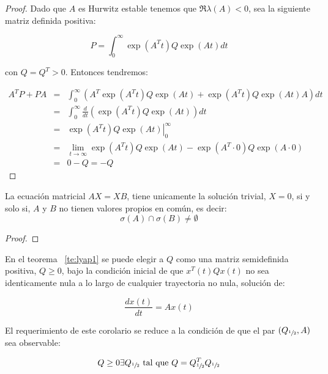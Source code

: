 \begin{proof}
        Dado que $A$ es Hurwitz estable tenemos que $\Re{\lambda(A)} < 0$, sea la siguiente matriz definida positiva:

        \begin{equation*}
            P = \int_0^{\infty} \exp{(A^Tt)} Q \exp(At) dt
        \end{equation*}

        con $Q = Q^T > 0$. Entonces tendremos:

        \begin{eqnarray*}
            A^T P + P A & = & \int_0^{\infty} \left( A^T \exp{(A^T t)} Q \exp{(At)} + \exp{(A^T t)} Q \exp{(At)} A \right) dt \\
            & = & \int_0^{\infty} \frac{d}{dt} \left( \exp{(A^T t)} Q \exp{(At)} \right) dt \\
            & = & \left. \exp{(A^T t)} Q \exp{(At)} \right|_0^{\infty} \\
            & = & \lim_{t \to \infty} \exp{(A^T t)} Q \exp{(At)} - \exp{(A^T \cdot 0)} Q \exp{(A \cdot 0)} \\
            & = & 0 - Q = - Q
        \end{eqnarray*}
    \end{proof}

    \begin{lema}
        La ecuación matricial $A X = X B$, tiene unicamente la solución trivial, $X=0$, si y solo si, $A$ y $B$ no tienen valores propios en común, es decir:
        \begin{equation*}
            \sigma(A) \cap \sigma(B) \ne \emptyset
        \end{equation*}
    \end{lema}

    \begin{proof}
    \end{proof}

    \begin{corolario}
        En el teorema ~\ref{te:lyap1} se puede elegir a $Q$ como una matriz semidefinida positiva, $Q \ge 0$, bajo la condición inicial de que $x^T(t) Q x(t)$ no sea identicamente nula a lo largo de cualquier trayectoria no nula, solución de:

        \begin{equation*}
            \frac{d x(t)}{dt} = A x(t)
        \end{equation*}

        El requerimiento de este corolario se reduce a la condición  de que el par $(Q_{\sfrac{1}{2}}, A)$ sea observable:

        \begin{equation*}
            Q \ge 0 \exists Q_{\sfrac{1}{2}} \text{ tal que } Q = Q_{\sfrac{1}{2}}^T Q_{\sfrac{1}{2}}
        \end{equation*}
    \end{corolario}

